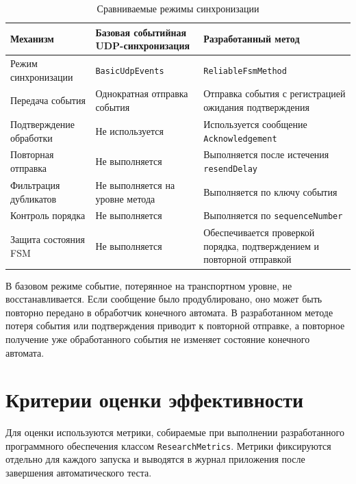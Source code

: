 \begin{table}[H]
	\caption{Сравниваемые режимы синхронизации}
	\label{tab:research-modes}
	\centering
	\small
	\renewcommand{\arraystretch}{1.2}
	\begin{tabular}{|p{3.4cm}|p{4.6cm}|p{4.6cm}|}
		\hline
		Механизм & Базовая событийная UDP-синхронизация & Разработанный метод \\ \hline
		Режим синхронизации & \texttt{BasicUdpEvents} & \texttt{ReliableFsmMethod} \\ \hline
		Передача события & Однократная отправка события & Отправка события с регистрацией ожидания подтверждения \\ \hline
		Подтверждение обработки & Не используется & Используется сообщение \texttt{Acknowledgement} \\ \hline
		Повторная отправка & Не выполняется & Выполняется после истечения \texttt{resendDelay} \\ \hline
		Фильтрация дубликатов & Не выполняется на уровне метода & Выполняется по ключу события \\ \hline
		Контроль порядка & Не выполняется & Выполняется по \texttt{sequenceNumber} \\ \hline
		Защита состояния FSM & Не выполняется & Обеспечивается проверкой порядка, подтверждением и повторной отправкой \\ \hline
	\end{tabular}
\end{table}

В базовом режиме событие, потерянное на транспортном уровне, не восстанавливается. Если сообщение было продублировано, оно может быть повторно передано в обработчик конечного автомата. В разработанном методе потеря события или подтверждения приводит к повторной отправке, а повторное получение уже обработанного события не изменяет состояние конечного автомата.

\section{Критерии оценки эффективности}

Для оценки используются метрики, собираемые при выполнении разработанного программного обеспечения классом \texttt{ResearchMetrics}. Метрики фиксируются отдельно для каждого запуска и выводятся в журнал приложения после завершения автоматического теста.

